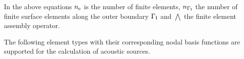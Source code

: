 \documentclass[a4paper,10pt]{article}
\begin{document}
\noindent In the above equations $n_{\rm e}$ is the number of finite elements,
$n_{\Gamma_{\rm I}}$  the number  of finite surface  elements along  the outer
boundary  $\Gamma_{\rm  I}$  and   $\bigwedge$  the  finite  element  assembly
operator.



The following element types with their corresponding nodal basis functions are
supported for the calculation of acoustic sources.





\end{document}

